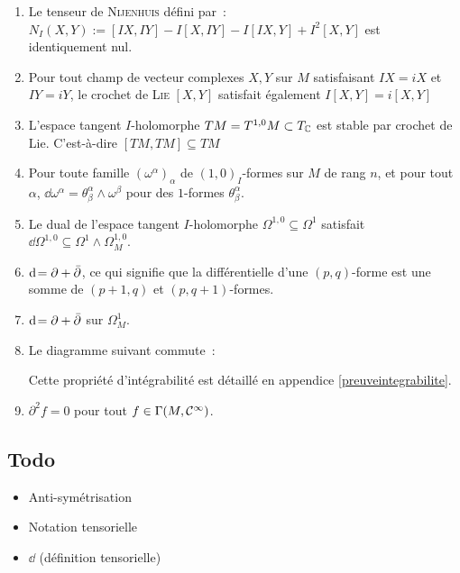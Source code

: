 \documentclass[a4paper,11pt,draft,makeidx,twocolumn]{amsart}
\begin{document}
\begin{enumerate}[($i$)]
\item Le tenseur de \textsc{Nijenhuis} défini par~: $N_I(X,Y) := [ I X , I Y ] - I [ X , I Y ] - I [ I X , Y ] + I^2 [ X , Y ]$ est identiquement nul.
\item Pour tout champ de vecteur complexes $X,Y$ sur $M$ satisfaisant $I X=iX$ et $I Y=iY$, le crochet de \textsc{Lie} $[X,Y]$ satisfait également $I[X,Y] = i[X,Y]$
\item L'espace tangent $I$-holomorphe $TM = T^{1,0}M \subset T_{\mathbb{C}}$  est stable par crochet de Lie. C'est-à-dire $[TM,TM] \subseteq TM$
\item Pour toute famille $(\omega^\alpha)_\alpha$ de $(1,0)_I$-formes sur $M$ de rang $n$, et pour tout $\alpha$, $\dd \omega^\alpha = \theta^\alpha_\beta \wedge \omega^\beta$ pour des $1$-formes $\theta^\alpha_\beta$.
\item Le dual de l'espace tangent $I$-holomorphe $\Omega^{1,0} \subseteq \Omega^1$ satisfait $\dd \Omega^{1,0} \subseteq \Omega^1 \wedge \Omega^{1,0}_M$.
\item $\operatorname{d\!} = \partial + \operatorname{\bar{\partial}}$, ce qui signifie que la différentielle d'une $(p,q)$-forme est une somme de $(p+1,q)$ et $(p,q+1)$-formes.
\item $\operatorname{d\!}  = \partial + \operatorname{\bar{\partial}}$ sur $\Omega^1_M$.
\item Le diagramme suivant commute~:
\begin{center}\end{center}
Cette propriété d'intégrabilité est détaillé en appendice \autoref{preuveintegrabilite}.
\item $\partial^2 f = 0$ pour tout $f \in\Gamma(M,\mathcal{C}^\infty)$.
\end{enumerate}

\subsection*{Todo}
\begin{itemize}
\item Anti-symétrisation
\item Notation tensorielle
\item $\dd$ (définition tensorielle)
\end{itemize}
\end{document}
